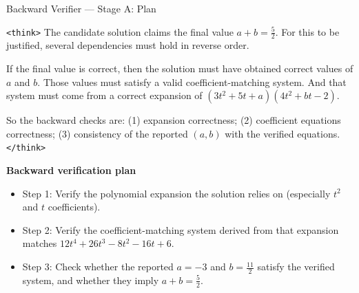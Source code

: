 \documentclass[11pt]{article}
\begin{document}
\begin{exbox}{Backward Verifier — Stage A: Plan}

\texttt{<think>}
The candidate solution claims the final value $a+b=\frac{5}{2}$.
For this to be justified, several dependencies must hold in reverse order.

If the final value is correct, then the solution must have obtained correct
values of $a$ and $b$.
Those values must satisfy a valid coefficient-matching system.
And that system must come from a correct expansion of
$(3t^2+5t+a)(4t^2+bt-2)$.

So the backward checks are:
(1) expansion correctness;
(2) coefficient equations correctness;
(3) consistency of the reported $(a,b)$ with the verified equations.
\texttt{</think>}

\noindent
\textbf{Backward verification plan}
\begin{itemize}
  \item Step 1: Verify the polynomial expansion the solution relies on (especially $t^2$ and $t$ coefficients).
  \item Step 2: Verify the coefficient-matching system derived from that expansion matches $12t^4+26t^3-8t^2-16t+6$.
  \item Step 3: Check whether the reported $a=-3$ and $b=\frac{11}{2}$ satisfy the verified system, and whether they imply $a+b=\frac{5}{2}$.
\end{itemize}

\end{exbox}
\end{document}
